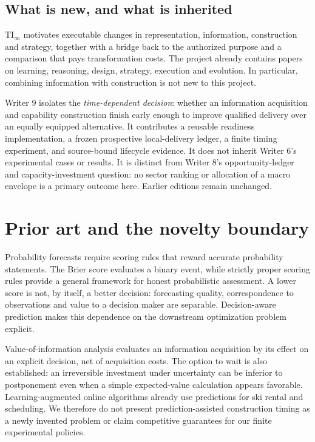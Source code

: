 \documentclass[11pt,a4paper]{article}
\newcommand{\TI}{\ensuremath{\mathrm{TI}_{\infty}}}
\begin{document}
\subsection{What is new, and what is inherited}
\TI{} motivates executable changes in representation, information, construction and strategy, together with a bridge back to the authorized purpose and a comparison that pays transformation costs. The project already contains papers on learning, reasoning, design, strategy, execution and evolution. In particular, combining information with construction is not new to this project. \citep{ti2026,outlearn2026,outstrategise2026,outexecute2026}

Writer 9 isolates the \emph{time-dependent decision}: whether an information acquisition and capability construction finish early enough to improve qualified delivery over an equally equipped alternative. It contributes a reusable readiness implementation, a frozen prospective local-delivery ledger, a finite timing experiment, and source-bound lifecycle evidence. It does not inherit Writer 6's experimental cases or results. It is distinct from Writer 8's opportunity-ledger and capacity-investment question: no sector ranking or allocation of a macro envelope is a primary outcome here. Earlier editions remain unchanged.

\section{Prior art and the novelty boundary}
Probability forecasts require scoring rules that reward accurate probability statements. The Brier score evaluates a binary event, while strictly proper scoring rules provide a general framework for honest probabilistic assessment. \citep{brier1950,gneiting2007} A lower score is not, by itself, a better decision: forecasting quality, correspondence to observations and value to a decision maker are separable. \citep{murphy1993} Decision-aware prediction makes this dependence on the downstream optimization problem explicit. \citep{elmachtoub2022}

Value-of-information analysis evaluates an information acquisition by its effect on an explicit decision, net of acquisition costs. \citep{howard1966} The option to wait is also established: an irreversible investment under uncertainty can be inferior to postponement even when a simple expected-value calculation appears favorable. \citep{mcdonald1986} Learning-augmented online algorithms already use predictions for ski rental and scheduling. \citep{purohit2018} We therefore do not present prediction-assisted construction timing as a newly invented problem or claim competitive guarantees for our finite experimental policies.
\end{document}
